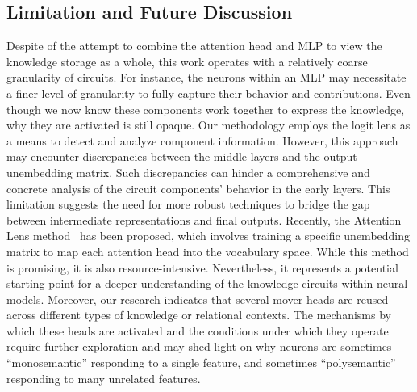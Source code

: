 \subsection{Limitation and Future Discussion}
\label{app:future-discussion}
Despite of the attempt to combine the attention head and MLP to view the knowledge storage as a whole, this work operates with a relatively coarse granularity of circuits. 
For instance, the neurons within an MLP may necessitate a finer level of granularity to fully capture their behavior and contributions.
Even though we now know these components work together to express the knowledge, why they are activated is still opaque.
Our methodology employs the logit lens as a means to detect and analyze component information. 
However, this approach may encounter discrepancies between the middle layers and the output unembedding matrix.
Such discrepancies can hinder a comprehensive and concrete analysis of the circuit components' behavior in the early layers. 
This limitation suggests the need for more robust techniques to bridge the gap between intermediate representations and final outputs.
Recently, the Attention Lens method~\cite{yuksekgonul2024attention} has been proposed, which involves training a specific unembedding matrix to map each attention head into the vocabulary space. 
While this method is promising, it is also resource-intensive. Nevertheless, it represents a potential starting point for a deeper understanding of the knowledge circuits within neural models.
Moreover, our research indicates that several mover heads are reused across different types of knowledge or relational contexts. 
The mechanisms by which these heads are activated and the conditions under which they operate require further exploration and may shed light on why neurons are sometimes ``monosemantic'' responding to a single feature, and sometimes ``polysemantic'' \cite{DBLP:journals/corr/abs-2209-10652} responding to many unrelated features. 
